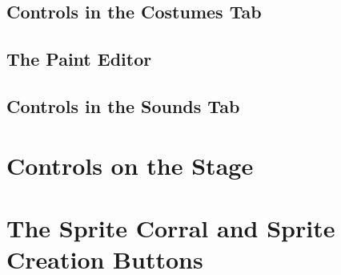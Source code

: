 \documentclass{report}
\begin{document}
\subsection{Controls in the Costumes Tab}
\subsection{The Paint Editor}
\subsection{Controls in the Sounds Tab}
\section{Controls on the Stage}
\section{The Sprite Corral and Sprite Creation Buttons}
\end{document}
